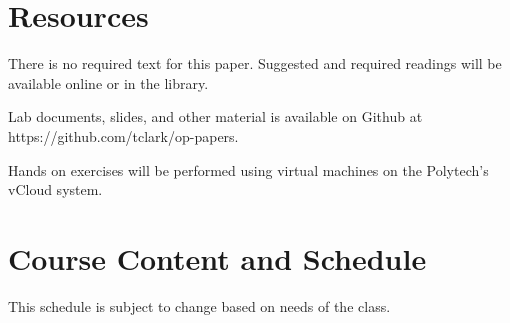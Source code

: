 \documentclass{article}
\begin{document}
\section*{Resources}
There is no required text for this paper.  Suggested and required readings will be available online or in the library.

Lab documents, slides, and other material is available on Github at https://github.com/tclark/op-papers.

Hands on exercises will be performed using virtual machines on the Polytech's vCloud system.

\newpage 

\section*{Course Content and Schedule}
This schedule is subject to change based on needs of the class.
\end{document}
